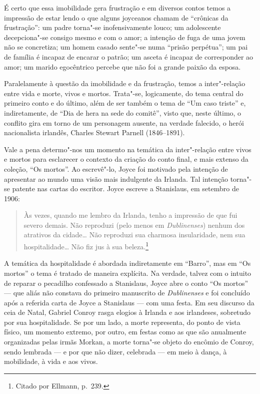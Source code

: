 É certo que essa imobilidade gera frustração e em diversos contos temos a
impressão de estar lendo o que alguns joyceanos chamam de “crônicas da
frustração”: um padre torna"-se inofensivamente louco; um adolescente
decepciona"-se consigo mesmo e com o amor; a intenção de fuga de uma jovem não
se concretiza; um homem casado sente"-se numa “prisão perpétua”; um pai de
família é incapaz de encarar o patrão; um asceta é incapaz de corresponder ao
amor; um marido egocêntrico percebe que não foi a grande paixão da esposa.

Paralelamente à questão da imobilidade e da frustração, temos a inter"-relação
entre vida e morte, vivos e mortos. Trata"-se, logicamente, do tema central do
primeiro conto e do último, além de ser também o tema de “Um caso triste” e,
indiretamente, de “Dia de hera na sede do comitê”, visto que, neste último, o
conflito gira em torno de um personagem ausente, na verdade falecido, o herói
nacionalista irlandês, Charles Stewart Parnell (1846--1891).

Vale a pena determo"-nos um momento na temática da inter"-relação entre vivos e
mortos para esclarecer o contexto da criação do conto final, e mais extenso da
coleção, “Os mortos”. Ao escrevê"-lo, Joyce foi motivado pela intenção
de apresentar ao mundo uma visão mais indulgente da Irlanda. Tal intenção
torna"-se patente nas cartas do escritor. Joyce escreve a Stanislaus, em
setembro de 1906: 

\begin{quote}
Às vezes, quando me lembro da Irlanda, tenho a impressão de
que fui severo demais. Não reproduzi (pelo menos em \textit{Dublinenses}) nenhum
dos atrativos da cidade\ldots{} Não reproduzi sua charmosa insularidade, nem sua
hospitalidade\ldots{} Não fiz jus à sua beleza.\footnote{ Citado por Ellmann, p.~239.}
\end{quote}

A temática da hospitalidade é abordada indiretamente em “Barro”, mas em “Os
mortos” o tema é tratado de maneira explícita. Na verdade, talvez com o intuito
de reparar o pecadilho confessado a Stanislaus, Joyce abre o conto “Os mortos”
--- que aliás não constava do primeiro manuscrito de \textit{Dublinenses} e
foi concluído após a referida carta de Joyce a Stanislaus --- com uma festa.
Em seu discurso da ceia de Natal, Gabriel Conroy rasga elogios à Irlanda e aos
irlandeses, sobretudo por sua hospitalidade. Se por um lado, a morte
representa, do ponto de vista físico, um momento extremo, por outro, em festas
como as que são anualmente organizadas pelas irmãs Morkan, a morte torna"-se
objeto do encômio de Conroy, sendo lembrada --- e por que não dizer, celebrada ---
em meio à dança, à mobilidade, à vida e aos vivos.

